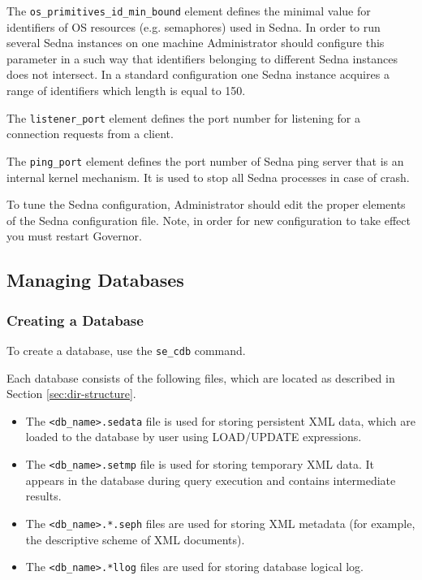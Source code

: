 \documentclass[a4paper,12pt]{article}
\begin{document}
The \verb!os_primitives_id_min_bound! element defines the minimal value for identifiers of OS resources (e.g. semaphores) used in Sedna. In order to run several Sedna instances on one machine Administrator should configure this parameter in a such way that identifiers belonging to different Sedna instances does not intersect. In a standard configuration one Sedna instance acquires a range of identifiers which length is equal to 150.

The \verb!listener_port! element defines the port number for listening for a connection requests from a client.

The \verb!ping_port! element defines the port number of Sedna ping server that is an internal kernel mechanism. It is used to stop all Sedna processes in case of crash. 
 
To tune the Sedna configuration, Administrator should edit the proper elements of the Sedna configuration file. Note, in order for new configuration to take effect you must restart Governor.

\subsection{Managing Databases}
\subsubsection{Creating a Database}
\label{CreateDB}
To create a database, use the \verb!se_cdb! command.

Each database consists of the following files, which are located as described in Section \ref{sec:dir-structure}.

\begin{itemize}
\item The \verb!<db_name>.sedata! file is used for storing persistent XML data, which are loaded to the database by user using LOAD/UPDATE expressions. 
\item The \verb!<db_name>.setmp! file is used for storing temporary XML data. It appears in the database during query execution and contains intermediate results.
\item The \verb!<db_name>.*.seph! files are used for storing XML metadata (for example, the descriptive scheme of XML documents).
\item The \verb!<db_name>.*llog! files are used for storing database logical log.
\end{itemize}
\end{document}
